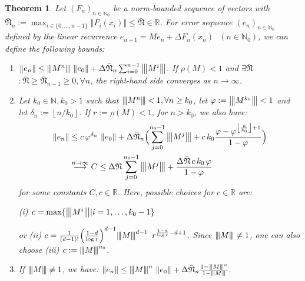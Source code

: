 \documentclass{article} %
\newtheorem{thm}{Theorem}[section]
\theoremstyle{definition}
\theoremstyle{remark}
\newcommand{\matnorm}[1]{{\left\vert\kern-0.25ex\left\vert\kern-0.25ex\left\vert #1 
    \right\vert\kern-0.25ex\right\vert\kern-0.25ex\right\vert}}
\newcommand{\norm}[1]{\left\Vert#1\right\Vert}
\newcommand{\Real}{\mathbb R}
\newcommand{\nat}{\mathbb N}
\newcommand{\vc}[1]{#1}
\newcommand{\floor}[1]{ \left\lfloor #1 \right\rfloor }
\newcommand{\specrad}{\rho}
\newcommand{\maxerrn}{\bar{\mathfrak N}} %
\newcommand{\tinc}{\ensuremath{ \Delta}}
\begin{document}
\begin{thm}\label{thm:normboundsboundeddisturbmainbody}
Let $(F_n)_{n \in \nat_0}$ be a norm-bounded sequence of vectors with $\maxerrn_n :=\max_{i \in \{0,\ldots,n-1\}} \norm{F_i(x_i)} \leq \maxerrn \in \Real$. 
For error sequence $(e_n)_{n \in \nat_0}$ defined by the linear recurrence 
	$e_{n+1}  = M e_n + \tinc F_n(x_n) \,\,\,\, (n \in \nat_0)$, we can define the following bounds:
	
	\begin{enumerate}
	\item $\norm{\vc e_n} \leq \matnorm{M^{n}} \, \norm{\vc e_0} + \tinc \maxerrn_{n} \sum_{i=0}^{n-1}  \matnorm{M^{i}}$. If $\specrad(M) <1$ and $\exists \maxerrn$ $:\maxerrn\geq \maxerrn_{n-1} \geq 0, \forall n$, the right-hand side converges as $n \to \infty$.
	\item Let $k_0 \in \nat, k_0 >1$ such that $\matnorm{M^n} <1, \forall n \geq k_0$, let $\varphi := \matnorm{M^{k_0}} <1$ and let $\delta_n := \floor{n/k_0}$. If $r:=\specrad(M) < 1$, for $n > k_0$,  we also have:
	\begin{align*} \norm{\vc e_n} &\leq c \, \varphi^{\delta_n} \, \norm{\vc e_0} + \tinc \maxerrn_{n} \Bigl(\sum_{j=0}^{n_0-1} \matnorm{M^j} + c \, k_0 \frac{\varphi-\varphi^{ \floor{\frac{n}{k_0}}+1 }}{1-\varphi} \Bigr)\\
	& \stackrel{n \to \infty}{\longrightarrow} C \leq \tinc \maxerrn \sum_{j=0}^{n_0-1} \matnorm{M^j} 
	+ \frac{\tinc \maxerrn\,  c\, k_0 \,\varphi}{1-\varphi} 
	\end{align*} 
	for some constants $C,c \in \Real$.
	Here, possible choices for $c \in \Real$ are: 
	
(i) $c= \max\{\matnorm{M^i} | i=1,\ldots,k_0-1 \}$ 

or (ii) $c = \frac{1}{(d-1)!} \Bigl(\frac{1 - d}{\log r}\Bigr)^{d-1}	\matnorm{M}^{d-1}\, \, \, r^{\frac{1 - d}{\log r}-d+1}  $.
%
Since $\matnorm{M} \neq 1$, one can also choose (iii) $c:= \matnorm{M}^{n_0}$. %

\item If $\matnorm{M} \neq 1$, we have: \newline
$\norm{\vc e_n} \leq \matnorm{M}^{n} \, \norm{\vc e_0} + \tinc \maxerrn_{n}   \frac{1-\matnorm{M}^n}{1-\matnorm{M}}. $
	\end{enumerate}
%
\end{thm}
\end{document}
